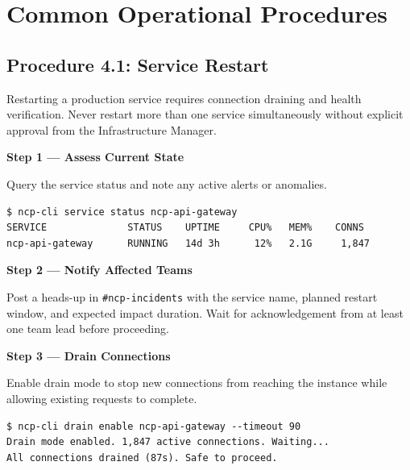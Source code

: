 \section{Common Operational Procedures}

\subsection{Procedure 4.1: Service Restart}

Restarting a production service requires connection draining and health verification. Never restart more than one service simultaneously without explicit approval from the Infrastructure Manager.

\medskip
\begin{stepbox}
\textbf{Step 1 --- Assess Current State}\smallskip

Query the service status and note any active alerts or anomalies.
\end{stepbox}

\begin{cmdbox}
\begin{Verbatim}[fontsize=\footnotesize]
$ ncp-cli service status ncp-api-gateway
SERVICE              STATUS    UPTIME     CPU%   MEM%    CONNS
ncp-api-gateway      RUNNING   14d 3h      12%   2.1G     1,847
\end{Verbatim}
\end{cmdbox}

\begin{stepbox}
\textbf{Step 2 --- Notify Affected Teams}\smallskip

Post a heads-up in \texttt{\#ncp-incidents} with the service name, planned restart window, and expected impact duration. Wait for acknowledgement from at least one team lead before proceeding.
\end{stepbox}

\begin{stepbox}
\textbf{Step 3 --- Drain Connections}\smallskip

Enable drain mode to stop new connections from reaching the instance while allowing existing requests to complete.
\end{stepbox}

\begin{cmdbox}
\begin{Verbatim}[fontsize=\footnotesize]
$ ncp-cli drain enable ncp-api-gateway --timeout 90
Drain mode enabled. 1,847 active connections. Waiting...
All connections drained (87s). Safe to proceed.
\end{Verbatim}
\end{cmdbox}

